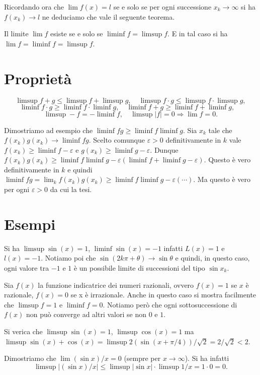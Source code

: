 \documentclass[italian,a4paper]{article}
\renewcommand{\epsilon}{\varepsilon}
\begin{document}
Ricordando ora che $\lim f(x)=l$ se e solo se per ogni successione
$x_k\to \infty$ si ha $f(x_k)\to l$ ne deduciamo che vale il seguente teorema.

Il limite $\lim f$ esiste se e solo se $\liminf f = \limsup f$. E
in tal caso si ha $\lim f=\liminf f=\limsup f$.

\section*{Propriet\`a}
\[
\limsup f+g \le \limsup f + \limsup g,\quad
\limsup f\cdot g \le \limsup f \cdot \limsup g,
\]\[
\liminf f\cdot g \ge \liminf f \cdot \liminf g,\quad
\liminf f+g \ge \liminf f + \liminf g,\quad
\]\[
\limsup -f = -\liminf f,\quad
\limsup |f|=0 \Rightarrow \lim f=0.
\]

Dimostriamo ad esempio che $\liminf fg\ge \liminf f\liminf g$.
Sia $x_k$ tale che $f(x_k)g(x_k)\to \liminf fg$. Scelto comunque
$\epsilon>0$ definitivamente in $k$ vale $f(x_k)\ge \liminf
f-\epsilon$ e $g(x_k)\ge \liminf g -\epsilon$. Dunque $f(x_k)g(x_k)
\ge \liminf f \liminf g - \epsilon (\liminf f + \liminf g-\epsilon)$. Questo \`e
vero definitivamente in $k$ e quindi $\liminf fg = \lim_k
f(x_k)g(x_k)\ge \liminf f \liminf g - \epsilon (\cdots)$. Ma questo
\`e vero per ogni $\epsilon>0$ da cui la tesi.

\section*{Esempi}
Si ha $\limsup \sin(x)=1$, $\liminf \sin(x)=-1$ infatti $L(x)=1$ e
$l(x)=-1$. Notiamo poi che $\sin(2k\pi+\theta)\to \sin\theta$ e
quindi, in questo caso, ogni valore tra $-1$ e $1$
\`e un possibile limite di successioni del tipo $\sin x_k$.

Sia $f(x)$ la funzione indicatrice dei numeri razionali, ovvero
$f(x)=1$ se $x$ \`e razionale, $f(x)=0$ se x \`e irrazionale. Anche in
questo caso si mostra facilmente che $\limsup f =1$ e $\liminf f
=0$. Notiamo per\`o che ogni sottosuccessione di $f(x)$ non pu\`o
converge ad altri valori se non $0$ e $1$.

Si verica che $\limsup \sin(x)=1$, $\limsup \cos(x)=1$ ma $\limsup
\sin(x) + \cos(x) = \limsup 2(\sin(x+\pi/4))/\sqrt{2} = 2/\sqrt{2}<2$.

Dimostriamo che $\lim (\sin x) /x =0$ (sempre per $x\to
\infty$). Si ha infatti
\[
  \limsup \vert (\sin x) /x\vert \le \limsup \vert \sin x\vert \cdot
\limsup 1/x = 1 \cdot 0 = 0. 
\] 
\end{document}
